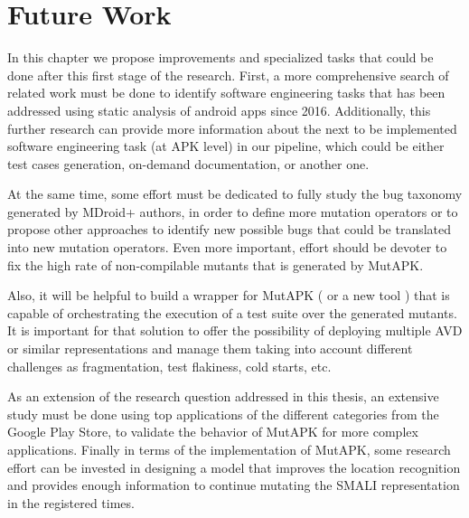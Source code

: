 
\chapter{Future Work} %

\label{ChapterX} %

In this chapter we propose improvements and specialized tasks that could be done after this first stage of the research. First, a more comprehensive search of related work must be done to identify software engineering tasks that has been addressed using static analysis of android apps since 2016. Additionally, this further research can provide more information about the next to be implemented software engineering task (at APK level) in our pipeline, which could be either test cases generation, on-demand documentation, or another one.

At the same time, some effort must be dedicated to fully study the bug taxonomy generated by MDroid+ authors, in order to define more mutation operators or to propose other approaches to identify new possible bugs that could be translated into new mutation operators. Even more important, effort should be devoter to fix the high rate of non-compilable mutants that is generated by MutAPK.

Also, it will be helpful to build a wrapper for MutAPK ( or a new tool ) that is capable of orchestrating the execution of a test suite over the generated mutants. It is important for that solution to offer the possibility of deploying multiple AVD or similar representations and manage them taking into account different challenges as fragmentation, test flakiness, cold starts, etc. \cite{8094439}

As an extension of the research question addressed in this thesis, an extensive study must be done using top applications of the different categories from the Google Play Store, to validate the behavior of MutAPK for more complex applications.
Finally in terms of the implementation of MutAPK, some research effort can be invested in designing a model that improves the location recognition and provides enough information to continue mutating the SMALI representation in the registered times.